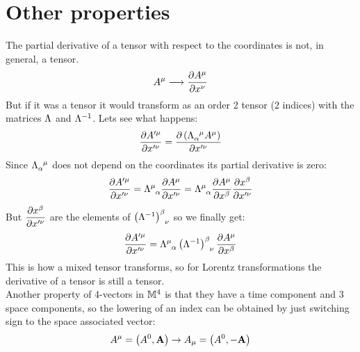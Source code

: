\section{Other properties}
The partial derivative of a tensor with respect to the coordinates is not, in general, a tensor.
\begin{equation}
  A^{\mu} \longrightarrow \pdv{A^{\mu}}{x^{\nu}}
\end{equation}
But if it was a tensor it would transform as an order 2 tensor (2 indices) with the matrices $\Lambda$ and $\Lambda^{-1}$. Lets see what happens:
\begin{equation}
  \pdv{A'^{\mu}}{x'^{\nu}} = \pdv{\brackets{\tensor{\lm}{_{\alpha}^{\mu}} A^{\mu}}}{x'^{\nu}}
\end{equation}
Since $\tensor{\lm}{_{\alpha}^{\mu}}$ does not depend on the coordinates its partial derivative is zero:
\begin{equation}
  \pdv{A'^{\mu}}{x'^{\nu}} = \tensor{\lm}{^{\mu}_{\alpha}} \pdv{A^{\mu}}{x'^{\nu}} = \tensor{\lm}{^{\mu}_{\alpha}} \pdv{A^{\mu}}{x^{\beta}}\pdv{x^{\beta}}{x'^{\nu}}
\end{equation}
But $\pdv{x^{\beta}}{x'^{\nu}}$ are the elements of $\tensor{\brackets{\lm^{-1}}}{^{\beta}_{\nu}}$ so we finally get:
\begin{equation}
  \pdv{A'^{\mu}}{x'^{\nu}} = \tensor{\lm}{^{\mu}_{\alpha}} \tensor{\brackets{\lm^{-1}}}{^{\beta}_{\nu}} \pdv{A^{\mu}}{x^{\beta}}
\end{equation}
This is how a mixed tensor transforms, so for Lorentz transformations the derivative of a tensor is still a tensor.\\
Another property of 4-vectors in $\mathbb{M}^4$ is that they have a time component and 3 space components, so the lowering of an index can be obtained by just switching sign to the space associated vector:
\begin{equation}
  A^{\mu} = \left(A^0, \vb{A}\right) \rightarrow A_{\mu} = \left(A^0, -\vb{A}\right)
\end{equation}
